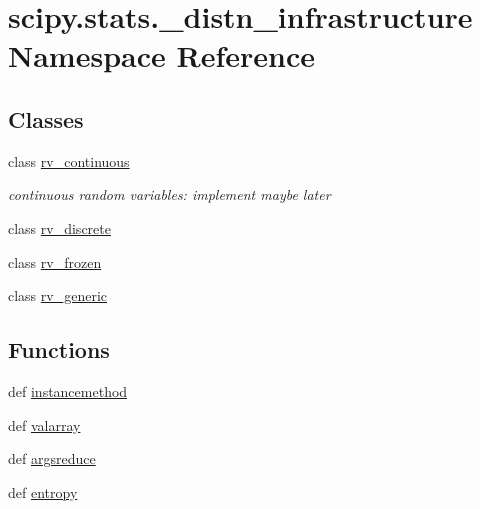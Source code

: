 \hypertarget{namespacescipy_1_1stats_1_1__distn__infrastructure}{}\section{scipy.\+stats.\+\_\+distn\+\_\+infrastructure Namespace Reference}
\label{namespacescipy_1_1stats_1_1__distn__infrastructure}
\subsection*{Classes}
\begin{DoxyCompactItemize}
\item 
class \hyperlink{classscipy_1_1stats_1_1__distn__infrastructure_1_1rv__continuous}{rv\+\_\+continuous}
\begin{DoxyCompactList}\small\item\em continuous random variables\+: implement maybe later \end{DoxyCompactList}\item 
class \hyperlink{classscipy_1_1stats_1_1__distn__infrastructure_1_1rv__discrete}{rv\+\_\+discrete}
\item 
class \hyperlink{classscipy_1_1stats_1_1__distn__infrastructure_1_1rv__frozen}{rv\+\_\+frozen}
\item 
class \hyperlink{classscipy_1_1stats_1_1__distn__infrastructure_1_1rv__generic}{rv\+\_\+generic}
\end{DoxyCompactItemize}
\subsection*{Functions}
\begin{DoxyCompactItemize}
\item 
def \hyperlink{namespacescipy_1_1stats_1_1__distn__infrastructure_a65d53d4d69fd4062bcb1027c0892d388}{instancemethod}
\item 
def \hyperlink{namespacescipy_1_1stats_1_1__distn__infrastructure_a27724c4950ce684613cabda1cecda23b}{valarray}
\item 
def \hyperlink{namespacescipy_1_1stats_1_1__distn__infrastructure_af71dbc5e912a2d0d759dea7a68f76cba}{argsreduce}
\item 
def \hyperlink{namespacescipy_1_1stats_1_1__distn__infrastructure_ab8d4fcdda2d378b44585835640ff2783}{entropy}
\end{DoxyCompactItemize}
